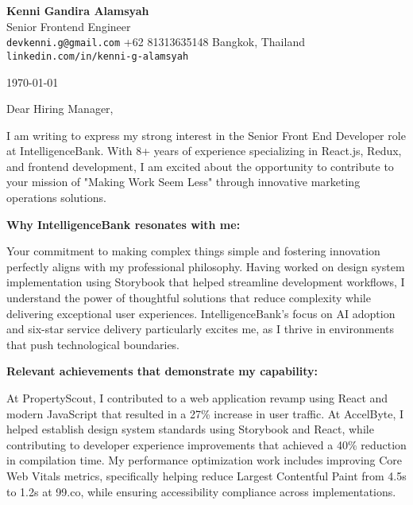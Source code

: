 \documentclass[12pt]{article}
\newcommand{\firstname}{Kenni Gandira}
\newcommand{\lastname}{Alamsyah}
\begin{document}
\begin{center}
    {\Huge\textbf{\firstname{} \lastname}}\\[0.5em]
    {\large Senior Frontend Engineer}\\[1em]

    \texttt{devkenni.g@gmail.com} \textbar{} +62 81313635148 \textbar{} Bangkok, Thailand\\[0.5em]
    \texttt{linkedin.com/in/kenni-g-alamsyah}
\end{center}

\vspace{1.5em}

\noindent\today

\vspace{1em}

\noindent Dear Hiring Manager,

\vspace{0.5em}

I am writing to express my strong interest in the Senior Front End Developer role at IntelligenceBank. With 8+ years of experience specializing in React.js, Redux, and frontend development, I am excited about the opportunity to contribute to your mission of "Making Work Seem Less" through innovative marketing operations solutions.

\vspace{0.5em}

\textbf{Why IntelligenceBank resonates with me:}

Your commitment to making complex things simple and fostering innovation perfectly aligns with my professional philosophy. Having worked on design system implementation using Storybook that helped streamline development workflows, I understand the power of thoughtful solutions that reduce complexity while delivering exceptional user experiences. IntelligenceBank's focus on AI adoption and six-star service delivery particularly excites me, as I thrive in environments that push technological boundaries.

\vspace{0.5em}

\textbf{Relevant achievements that demonstrate my capability:}

At PropertyScout, I contributed to a web application revamp using React and modern JavaScript that resulted in a 27\% increase in user traffic. At AccelByte, I helped establish design system standards using Storybook and React, while contributing to developer experience improvements that achieved a 40\% reduction in compilation time. My performance optimization work includes improving Core Web Vitals metrics, specifically helping reduce Largest Contentful Paint from 4.5s to 1.2s at 99.co, while ensuring accessibility compliance across implementations.
\end{document}

